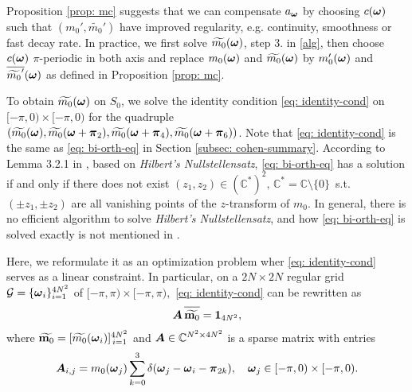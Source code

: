 Proposition \ref{prop: mc} suggests that we can compensate $a_{\boldsymbol{\omega}}$ by choosing $c(\boldsymbol{\omega})$ such that $(m_0',\widetilde{m_0}')$ have improved regularity, e.g. continuity, smoothness or fast decay rate. In practice, we first solve $\widetilde{m_{0}}(\boldsymbol{\omega})$, step 3. in \ref{alg}, then choose $c(\boldsymbol{\omega})$ $\pi$-periodic in both axis and replace $m_0(\boldsymbol{\omega})$ and $\widetilde{m_0}(\boldsymbol{\omega})$ by $m_0'(\boldsymbol{\omega})$ and $\overline{\widetilde{m_0}'}(\boldsymbol{\omega})$ as defined in Proposition \ref{prop: mc}.

To obtain $\widetilde{m_{0}}(\boldsymbol{\omega})$ on $S_0$, we solve the identity condition \eqref{eq: identity-cond} on $[-\pi, 0)\times[-\pi, 0 )$ for the quadruple $(\widetilde{m_{0}}(\boldsymbol{\omega}), \widetilde{m_{0}}(\boldsymbol{\omega}+\boldsymbol{\pi}_{2}), \widetilde{m_{0}}(\boldsymbol{\omega}+\boldsymbol{\pi}_{4}), \widetilde{m_{0}}(\boldsymbol{\omega}+\boldsymbol{\pi}_{6}))$. Note that \eqref{eq: identity-cond} is the same as \eqref{eq: bi-orth-eq} in Section \ref{subsec: cohen-summary}. 
According to Lemma 3.2.1 in \cite{cohen1993compactly}, based on {\it Hilbert's Nullstellensatz}, \eqref{eq: bi-orth-eq} has a solution if and only if there does not exist $(z_1,z_2)\in (\mathbb{C}^*)^2,\, \mathbb{C}^* = \mathbb{C}\setminus\{0\}$\, s.t. $(\pm z_1,\pm z_2)$ are all vanishing points of the $z$-transform of $m_0$.
In general, there is no efficient algorithm to solve {\it Hilbert's Nullstellensatz}, and how \eqref{eq: bi-orth-eq} is solved exactly is not mentioned in \cite{cohen1993compactly}.

Here, we reformulate it as an optimization problem wher \eqref{eq: identity-cond} serves as a linear constraint. In particular, on a $2N\times 2N$ regular grid $\mathcal{G}=\{\boldsymbol{\omega}_i\}_{i=1}^{4N^2}$ of $[-\pi, \pi)\times[-\pi, \pi), $ \eqref{eq: identity-cond} can be rewritten as
\begin{align}
\V{A}\, \overlinespace{\widetilde{\mathbf{m}_0}}= \mathbf{1}_{4N^2}, \label{eq: m0-A}%
\end{align}
where $\widetilde{\mathbf{m}_0} = [\widetilde{m_0}(\boldsymbol{\omega}_i)]_{\,i=1}^{4N^2}$ and $\boldsymbol{A}\in \mathbb{C}^{N^2\times 4N^2}$ is a sparse matrix with entries 
$$\boldsymbol{A}_{i,j} = m_0(\boldsymbol{\omega}_j)\sum_{k=0}^3\delta(\boldsymbol{\omega}_j-\boldsymbol{\omega}_i-\boldsymbol{\pi}_{2k}), \quad \boldsymbol{\omega}_j \in [-\pi,0)\times[-\pi,0).$$

